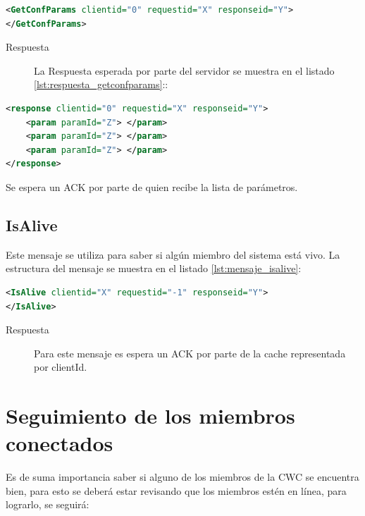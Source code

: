 \begin{lstlisting}[language=XML,caption={Mensaje de GetConfParams},label={lst:mensaje_getconfparams}]
<GetConfParams clientid="0" requestid="X" responseid="Y"> 
</GetConfParams>
\end{lstlisting}


\begin{description}
\item[Respuesta] La Respuesta esperada por parte del servidor se muestra en el listado \ref{lst:respuesta_getconfparams}::
\end{description}

\begin{lstlisting}[language=XML,caption={Mensaje de Respuesta de GetConfParams},label={lst:respuesta_getconfparams}]
<response clientid="0" requestid="X" responseid="Y"> 
	<param paramId="Z"> </param>
	<param paramId="Z"> </param>
	<param paramId="Z"> </param>
</response>
\end{lstlisting}


Se espera un ACK por parte de quien recibe la lista de parámetros.

\subsection{IsAlive}

Este mensaje se utiliza para saber si algún miembro del sistema está vivo. La estructura del mensaje se muestra en el listado \ref{lst:mensaje_isalive}:

\begin{lstlisting}[language=XML,caption={Mensaje de IsAlive},label={lst:mensaje_isalive}]
<IsAlive clientid="X" requestid="-1" responseid="Y"> 
</IsAlive>
\end{lstlisting}

\begin{description}
\item[Respuesta] Para este mensaje es espera un ACK por parte de la cache representada por clientId.
\end{description}

\section{Seguimiento de los miembros conectados}

Es de suma importancia saber si alguno de los miembros de la CWC se encuentra bien, para esto se deberá estar revisando que los miembros estén en línea, para lograrlo, se seguirá:


